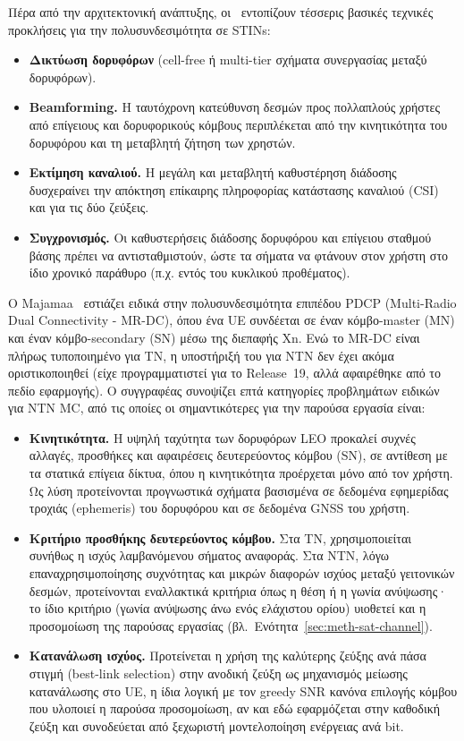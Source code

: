 Πέρα από την αρχιτεκτονική ανάπτυξης, οι~\cite{li2025advancing} εντοπίζουν
τέσσερις βασικές τεχνικές προκλήσεις για την πολυσυνδεσιμότητα σε STINs:

\begin{itemize}
  \item \textbf{Δικτύωση δορυφόρων} (cell-free ή multi-tier σχήματα
    συνεργασίας μεταξύ δορυφόρων).
  \item \textbf{Beamforming.} Η ταυτόχρονη κατεύθυνση δεσμών προς
    πολλαπλούς χρήστες από επίγειους και δορυφορικούς κόμβους περιπλέκεται
    από την κινητικότητα του δορυφόρου και τη μεταβλητή ζήτηση των
    χρηστών.
  \item \textbf{Εκτίμηση καναλιού.} Η μεγάλη και μεταβλητή καθυστέρηση
    διάδοσης δυσχεραίνει την απόκτηση επίκαιρης πληροφορίας κατάστασης
    καναλιού (CSI) και για τις δύο ζεύξεις.
  \item \textbf{Συγχρονισμός.} Οι καθυστερήσεις διάδοσης δορυφόρου και
    επίγειου σταθμού βάσης πρέπει να αντισταθμιστούν, ώστε τα σήματα να
    φτάνουν στον χρήστη στο ίδιο χρονικό παράθυρο (π.χ. εντός του κυκλικού
    προθέματος).
\end{itemize}

Ο Majamaa~\cite{majamaa2024toward} εστιάζει ειδικά στην πολυσυνδεσιμότητα
επιπέδου PDCP (Multi-Radio Dual Connectivity - MR-DC), όπου ένα UE
συνδέεται σε έναν κόμβο-master (MN) και έναν κόμβο-secondary (SN) μέσω της
διεπαφής Xn. Ενώ το MR-DC είναι πλήρως τυποποιημένο για TN, η υποστήριξή
του για NTN δεν έχει ακόμα οριστικοποιηθεί (είχε προγραμματιστεί για το
Release~19, αλλά αφαιρέθηκε από το πεδίο εφαρμογής). Ο συγγραφέας συνοψίζει
επτά κατηγορίες προβλημάτων ειδικών για NTN MC, από τις οποίες οι
σημαντικότερες για την παρούσα εργασία είναι:

\begin{itemize}
  \item \textbf{Κινητικότητα.} Η υψηλή ταχύτητα των δορυφόρων LEO προκαλεί
    συχνές αλλαγές, προσθήκες και αφαιρέσεις δευτερεύοντος κόμβου (SN), σε
    αντίθεση με τα στατικά επίγεια δίκτυα, όπου η κινητικότητα προέρχεται
    μόνο από τον χρήστη. Ως λύση προτείνονται προγνωστικά σχήματα βασισμένα
    σε δεδομένα εφημερίδας τροχιάς (ephemeris) του δορυφόρου και σε
    δεδομένα GNSS του χρήστη.
  \item \textbf{Κριτήριο προσθήκης δευτερεύοντος κόμβου.} Στα TN,
    χρησιμοποιείται συνήθως η ισχύς λαμβανόμενου σήματος αναφοράς. Στα
    NTN, λόγω επαναχρησιμοποίησης συχνότητας και μικρών διαφορών ισχύος
    μεταξύ γειτονικών δεσμών, προτείνονται εναλλακτικά κριτήρια όπως η
    θέση ή η γωνία ανύψωσης· το ίδιο κριτήριο (γωνία ανύψωσης άνω ενός
    ελάχιστου ορίου) υιοθετεί και η προσομοίωση της παρούσας εργασίας
    (βλ.~Ενότητα~\ref{sec:meth-sat-channel}).
  \item \textbf{Κατανάλωση ισχύος.} Προτείνεται η χρήση της καλύτερης
    ζεύξης ανά πάσα στιγμή (best-link selection) στην ανοδική ζεύξη ως
    μηχανισμός μείωσης κατανάλωσης στο UE, η ίδια λογική με τον greedy
    SNR κανόνα επιλογής κόμβου που υλοποιεί η παρούσα προσομοίωση, αν και
    εδώ εφαρμόζεται στην καθοδική ζεύξη και συνοδεύεται από ξεχωριστή
    μοντελοποίηση ενέργειας ανά bit.
\end{itemize}

